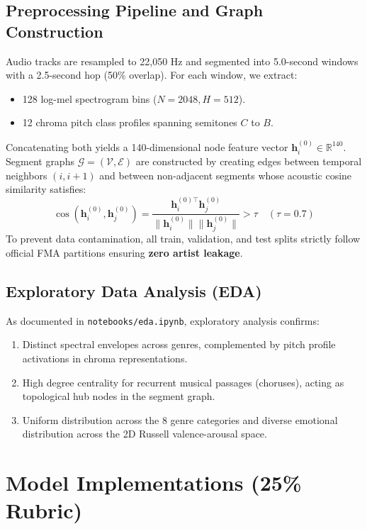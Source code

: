 \documentclass{article}
\begin{document}
\subsection{Preprocessing Pipeline and Graph Construction}
Audio tracks are resampled to 22,050 Hz and segmented into 5.0-second windows with a 2.5-second hop (50\% overlap). For each window, we extract:
\begin{itemize}
    \item 128 log-mel spectrogram bins ($N=2048, H=512$).
    \item 12 chroma pitch class profiles spanning semitones $C$ to $B$.
\end{itemize}
Concatenating both yields a 140-dimensional node feature vector $\mathbf{h}_i^{(0)} \in \mathbb{R}^{140}$.
Segment graphs $\mathcal{G} = (\mathcal{V}, \mathcal{E})$ are constructed by creating edges between temporal neighbors $(i, i+1)$ and between non-adjacent segments whose acoustic cosine similarity satisfies:
\begin{equation}
\cos(\mathbf{h}_i^{(0)}, \mathbf{h}_j^{(0)}) = \frac{\mathbf{h}_i^{(0)\top} \mathbf{h}_j^{(0)}}{\|\mathbf{h}_i^{(0)}\|\|\mathbf{h}_j^{(0)}\|} > \tau \quad (\tau = 0.7)
\end{equation}
To prevent data contamination, all train, validation, and test splits strictly follow official FMA partitions ensuring \textbf{zero artist leakage}.

\subsection{Exploratory Data Analysis (EDA)}
As documented in \texttt{notebooks/eda.ipynb}, exploratory analysis confirms:
\begin{enumerate}
    \item Distinct spectral envelopes across genres, complemented by pitch profile activations in chroma representations.
    \item High degree centrality for recurrent musical passages (choruses), acting as topological hub nodes in the segment graph.
    \item Uniform distribution across the 8 genre categories and diverse emotional distribution across the 2D Russell valence-arousal space.
\end{enumerate}

\section{Model Implementations (25\% Rubric)}
\end{document}
